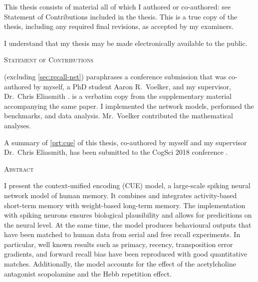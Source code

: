   \noindent
  This thesis consists of material all of which I authored or co-authored: see Statement of Contributions included in the thesis.
  This is a true copy of the thesis, including any required final revisions, as accepted by my examiners.

  \bigskip
  
  \noindent
I understand that my thesis may be made electronically available to the public.

\cleardoublepage

\begin{center}\textsc{Statement of Contributions}\end{center}
 (excluding \cref{sec:recall-net}) paraphrases a conference submission that was co-authored by myself, a PhD student Aaron R.\ Voelker, and my supervisor, Dr.\ Chris Eliasmith \parencite{jangosmann2017}.
 is a verbatim copy from the supplementary material accompanying the same paper.
I implemented the network models, performed the benchmarks, and data analysis.
Mr.~Voelker contributed the mathematical analyses.

A summary of \cref{prt:cue} of this thesis, co-authored by myself and my supervisor Dr.\ Chris Eliasmith, has been submitted to the CogSci 2018 conference \parencite{gosmann2018}.

\cleardoublepage


\begin{center}\textsc{Abstract}\end{center}
I present the context-unified encoding (CUE) model, a large-scale spiking neural network model of human memory.
It combines and integrates activity-based short-term memory with weight-based long-term memory.
The implementation with spiking neurons ensures biological plausibility and allows for predicitions on the neural level.
At the same time, the model produces behavioural outputs that have been matched to human data from serial and free recall experiments.
In particular, well known results such as primacy, recency, transposition error gradients, and forward recall bias have been reproduced with good quantitative matches.
Additionally, the model accounts for the effect of the acetylcholine antagonist scopolamine and the Hebb repetition effect.

